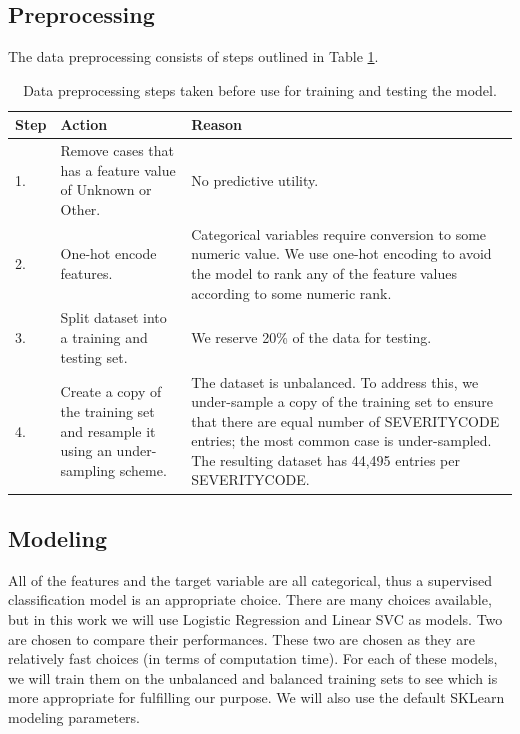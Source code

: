 \documentclass[12pt,a4paper,oneside]{article}
\begin{document}
\subsection{Preprocessing}

The data preprocessing consists of steps outlined in Table \ref{tbl:preprocessing}.

\begin{table}[htbp!]
    \centering
    \caption{Data preprocessing steps taken before use for training and testing the model.}
    \label{tbl:preprocessing}
    \begin{tabularx}{\textwidth}{l X X}
        \toprule
        Step & Action & Reason \\ 
        \midrule
        1. & Remove cases that has a feature value of Unknown or Other. & No predictive utility. \\ 
        2. & One-hot encode features. & Categorical variables require conversion to some numeric value. We use one-hot encoding to avoid the model to rank any of the feature values according to some numeric rank. \\
        3. & Split dataset into a training and testing set. & We reserve 20\% of the data for testing. \\
        4. & Create a copy of the training set and resample it using an under-sampling scheme. & The dataset is unbalanced. To address this, we under-sample a copy of the training set to ensure that there are equal number of SEVERITYCODE entries; the most common case is under-sampled. The resulting dataset has 44,495 entries per SEVERITYCODE. \\
        \bottomrule
    \end{tabularx}
\end{table}


\subsection{Modeling}

All of the features and the target variable are all categorical, thus a supervised classification model is an appropriate choice.
There are many choices available, but in this work we will use Logistic Regression and Linear SVC as models. 
Two are chosen to compare their performances. 
These two are chosen as they are relatively fast choices (in terms of computation time).
For each of these models, we will train them on the unbalanced and balanced training sets to see which is more appropriate for fulfilling our purpose.
We will also use the default SKLearn modeling parameters.
\end{document}
